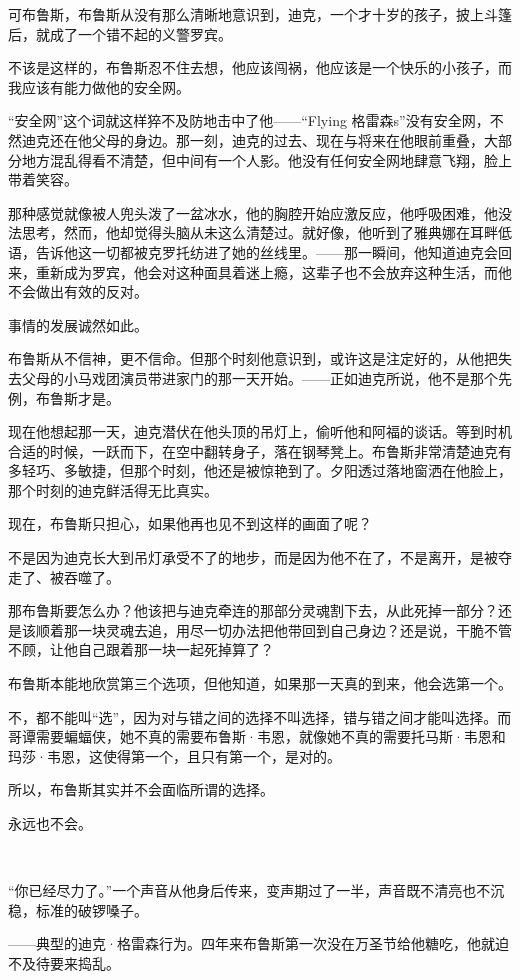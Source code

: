 \documentclass[../main]{subfiles}
\begin{document}
可布鲁斯，布鲁斯从没有那么清晰地意识到，迪克，一个才十岁的孩子，披上斗篷后，就成了一个错不起的义警罗宾。

不该是这样的，布鲁斯忍不住去想，他应该闯祸，他应该是一个快乐的小孩子，而我应该有能力做他的安全网。

“安全网”这个词就这样猝不及防地击中了他——“Flying
格雷森s”没有安全网，不然迪克还在他父母的身边。那一刻，迪克的过去、现在与将来在他眼前重叠，大部分地方混乱得看不清楚，但中间有一个人影。他没有任何安全网地肆意飞翔，脸上带着笑容。

那种感觉就像被人兜头泼了一盆冰水，他的胸腔开始应激反应，他呼吸困难，他没法思考，然而，他却觉得头脑从未这么清楚过。就好像，他听到了雅典娜在耳畔低语，告诉他这一切都被克罗托纺进了她的丝线里。——那一瞬间，他知道迪克会回来，重新成为罗宾，他会对这种面具着迷上瘾，这辈子也不会放弃这种生活，而他不会做出有效的反对。

事情的发展诚然如此。

布鲁斯从不信神，更不信命。但那个时刻他意识到，或许这是注定好的，从他把失去父母的小马戏团演员带进家门的那一天开始。——正如迪克所说，他不是那个先例，布鲁斯才是。

现在他想起那一天，迪克潜伏在他头顶的吊灯上，偷听他和阿福的谈话。等到时机合适的时候，一跃而下，在空中翻转身子，落在钢琴凳上。布鲁斯非常清楚迪克有多轻巧、多敏捷，但那个时刻，他还是被惊艳到了。夕阳透过落地窗洒在他脸上，那个时刻的迪克鲜活得无比真实。

现在，布鲁斯只担心，如果他再也见不到这样的画面了呢？

不是因为迪克长大到吊灯承受不了的地步，而是因为他不在了，不是离开，是被夺走了、被吞噬了。

那布鲁斯要怎么办？他该把与迪克牵连的那部分灵魂割下去，从此死掉一部分？还是该顺着那一块灵魂去追，用尽一切办法把他带回到自己身边？还是说，干脆不管不顾，让他自己跟着那一块一起死掉算了？

布鲁斯本能地欣赏第三个选项，但他知道，如果那一天真的到来，他会选第一个。

不，都不能叫“选”，因为对与错之间的选择不叫选择，错与错之间才能叫选择。而哥谭需要蝙蝠侠，她不真的需要布鲁斯·韦恩，就像她不真的需要托马斯·韦恩和玛莎·韦恩，这使得第一个，且只有第一个，是对的。

所以，布鲁斯其实并不会面临所谓的选择。

永远也不会。

~\

“你已经尽力了。”一个声音从他身后传来，变声期过了一半，声音既不清亮也不沉稳，标准的破锣嗓子。

——典型的迪克·格雷森行为。四年来布鲁斯第一次没在万圣节给他糖吃，他就迫不及待要来捣乱。
\end{document}
